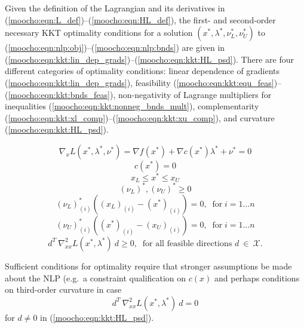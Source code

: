 \documentclass[pdf,12pt,report]{SANDreport}
\begin{document}
Given the definition of the Lagrangian and its derivatives in
(\ref{moocho:eqn:L_def})--(\ref{moocho:eqn:HL_def}), the first- and
second-order necessary KKT optimality conditions {}\cite{ref:nash_sofer_1996}
for a solution $(x^*, \lambda^*, \nu^*_L, \nu^*_U)$ to
(\ref{moocho:eqn:nlp:obj})--(\ref{moocho:eqn:nlp:bnds}) are given in
(\ref{moocho:eqn:kkt:lin_dep_grads})--(\ref{moocho:eqn:kkt:HL_psd}).  There
are four different categories of optimality conditions: linear dependence of
gradients (\ref{moocho:eqn:kkt:lin_dep_grads}), feasibility
(\ref{moocho:eqn:kkt:equ_feas})--(\ref{moocho:eqn:kkt:bnds_feas}),
non-negativity of Lagrange multipliers for inequalities
(\ref{moocho:eqn:kkt:nonneg_bnds_mult}), complementarity
(\ref{moocho:eqn:kkt:xl_comp})--(\ref{moocho:eqn:kkt:xu_comp}), and curvature
(\ref{moocho:eqn:kkt:HL_psd}).

{\bsinglespace
\begin{equation}
\nabla_{x} L(x^*,\lambda^*,\nu^*) = \nabla f(x^*) + \nabla c(x^*) \lambda^* + \nu^* = 0
\label{moocho:eqn:kkt:lin_dep_grads}
\end{equation}
%
\begin{equation}
c(x^*) = 0
\label{moocho:eqn:kkt:equ_feas}
\end{equation}
%
\begin{equation}
x_L \leq x^* \leq x_U
\label{moocho:eqn:kkt:bnds_feas}
\end{equation}
%
\begin{equation}
(\nu_L)^*, (\nu_U)^* \geq 0
\label{moocho:eqn:kkt:nonneg_bnds_mult}
\end{equation}
%
\begin{equation}
(\nu_L)^*_{(i)} ( (x_L)_{(i)} - (x^*)_{(i)} ) = 0, \;\; \mbox{for} \; i = 1 \ldots n
\label{moocho:eqn:kkt:xl_comp}
\end{equation}
%
\begin{equation}
(\nu_U)^*_{(i)} ( (x^*)_{(i)} - (x_U)_{(i)} ) = 0, \;\; \mbox{for} \; i = 1 \ldots n
\label{moocho:eqn:kkt:xu_comp}
\end{equation}
%
\begin{equation}
d^T \: \nabla_{xx}^2 L(x^*,\lambda^*) \: d \geq 0, \;\; \mbox{for all feasible directions $d \:\in\:\mathcal{X}$}.
\label{moocho:eqn:kkt:HL_psd}
\end{equation}
\esinglespace}

Sufficient conditions for optimality require that stronger assumptions be made
about the NLP (e.g.\ a constraint qualification on $c(x)$ and perhaps
conditions on third-order curvature in case
%
\[
d^T \: \nabla_{xx}^2 L(x^*,\lambda^*) \: d = 0
\]
%
for $d {}\ne 0$ in (\ref{moocho:eqn:kkt:HL_psd}).
\end{document}
